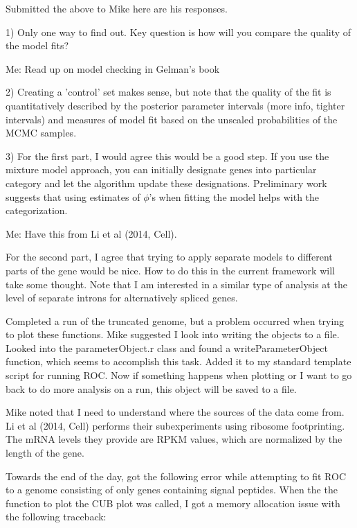 \documentclass[11pt]{labbook}
\begin{document}
Submitted the above to Mike here are his responses.

1) Only one way to find out.  Key question is how will you compare the quality of the model fits? 

Me: Read up on model checking in Gelman's book

2) Creating a 'control' set makes sense, but note that the quality of the fit is quantitatively described by the  posterior parameter intervals (more info, tighter intervals) and measures of model fit based on the unscaled probabilities of the MCMC samples.

3) For the first part, I would agree this would be a good step. If you use the mixture model approach, you can initially designate genes into particular category and let the algorithm update these designations.  Preliminary work 
suggests that using estimates of $\phi$'s when fitting the model helps with the categorization.

Me: Have this from Li et al (2014, Cell). 

For the second part, I agree that trying to apply separate models to different parts of the gene would be nice.  How to do this in the current framework will take some thought.  Note that I am interested in a similar type of analysis at the level of separate introns for alternatively spliced 
genes. 

Completed a run of the truncated genome, but a problem occurred when trying to plot these functions. Mike suggested I look into writing the objects to a file. Looked into the parameterObject.r class and found a writeParameterObject function, which seems to accomplish this task. Added it to my standard template script for running ROC. Now if something happens when plotting or I want to go back to do more analysis on a run, this object will be saved to a file. 

Mike noted that I need to understand where the sources of the data come from. Li et al (2014, Cell) performs their subexperiments using ribosome footprinting. The mRNA levels they provide are RPKM values, which are normalized by the length of the gene. 


Towards the end of the day, got the following error while attempting to fit ROC to a genome consisting of only genes containing signal peptides. When the the function to plot the CUB plot was called, I got a memory allocation issue with the following traceback:
\end{document}
